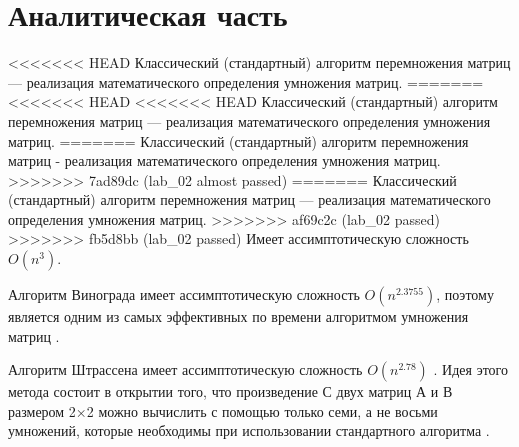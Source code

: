 \section{Аналитическая часть}

<<<<<<< HEAD
Классический (стандартный) алгоритм перемножения матриц --- реализация математического определения умножения матриц.
=======
<<<<<<< HEAD
<<<<<<< HEAD
Классический (стандартный) алгоритм перемножения матриц --- реализация математического определения умножения матриц.
=======
Классический (стандартный) алгоритм перемножения матриц - реализация математического определения умножения матриц.
>>>>>>> 7ad89dc (lab_02 almost passed)
=======
Классический (стандартный) алгоритм перемножения матриц --- реализация математического определения умножения матриц.
>>>>>>> af69c2c (lab_02 passed)
>>>>>>> fb5d8bb (lab_02 passed)
Имеет ассимптотическую сложность \(O(n^{3})\).

Алгоритм Винограда имеет ассимптотическую сложность \(O(n^{2.3755})\), поэтому является одним из самых эффективных по времени алгоритмом умножения матриц \cite{Виноград}. 

Алгоритм Штрассена имеет ассимптотическую сложность \(O(n^{2.78})\) \cite{Ultra-Fast}. 
Идея этого метода состоит в открытии того, что произведение С двух матриц А и В размером 2×2 можно вычислить с помощью только семи, а не восьми умножений, которые необходимы при использовании стандартного алгоритма \cite{Штрассен}.